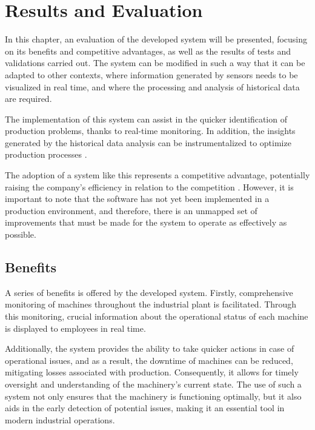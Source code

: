 \chapter{Results and Evaluation}\label{cap:results}

In this chapter, an evaluation of the developed system will be presented, focusing on its benefits and competitive advantages, as well as the results of tests and validations carried out. The system can be modified in such a way that it can be adapted to other contexts, where information generated by sensors needs to be visualized in real time, and where the processing and analysis of historical data are required.

The implementation of this system can assist in the quicker identification of production problems, thanks to real-time monitoring. In addition, the insights generated by the historical data analysis can be instrumentalized to optimize production processes \cite{raczSzabo2020realTime}.

The adoption of a system like this represents a competitive advantage, potentially raising the company's efficiency in relation to the competition \cite{ng2011realTime}. However, it is important to note that the software has not yet been implemented in a production environment, and therefore, there is an unmapped set of improvements that must be made for the system to operate as effectively as possible.

\section{Benefits}\label{sec:benfits}

A series of benefits is offered by the developed system. Firstly, comprehensive monitoring of machines throughout the industrial plant is facilitated. Through this monitoring, crucial information about the operational status of each machine is displayed to employees in real time. 

Additionally, the system provides the ability to take quicker actions in case of operational issues, and as a result, the downtime of machines can be reduced, mitigating losses associated with production. Consequently, it allows for timely oversight and understanding of the machinery's current state. The use of such a system not only ensures that the machinery is functioning optimally, but it also aids in the early detection of potential issues, making it an essential tool in modern industrial operations.

